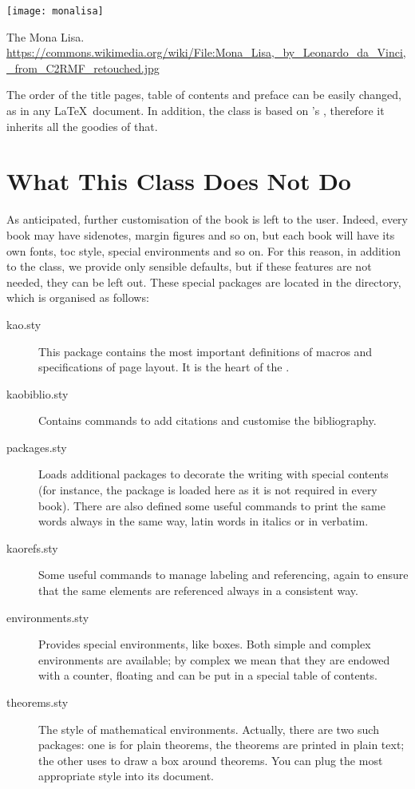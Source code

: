 \begin{marginfigure}[-5.5cm]
    \texttt{[image: monalisa]}
    \caption[The Mona Lisa]{The Mona Lisa.\\ 
    \url{https://commons.wikimedia.org/wiki/File:Mona_Lisa,_by_Leonardo_da_Vinci,_from_C2RMF_retouched.jpg}}
\end{marginfigure}

The order of the title pages, table of contents and preface can be 
easily changed, as in any \LaTeX\ document. In addition, the class is 
based on \KOMAScript's , therefore it inherits all the 
goodies of that.

\section{What This Class Does Not Do}

As anticipated, further customisation of the book is left to the user. 
Indeed, every book may have sidenotes, margin figures and so on, but 
each book will have its own fonts, toc style, special environments and 
so on. For this reason, in addition to the class, we provide only 
sensible defaults, but if these features are not needed, they can be 
left out. These special packages are located in the  
directory, which is organised as follows:

\begin{description}
    \item[kao.sty] This package contains the most important definitions 
    of macros and specifications of page layout. It is the heart of the 
    .
    \item[kaobiblio.sty] Contains commands to add citations and 
    customise the bibliography.
    \item[packages.sty] Loads additional packages to decorate the 
    writing with special contents (for instance, the  
    package is loaded here as it is not required in every book). There 
    are also defined some useful commands to print the same words always 
    in the same way, \eg latin words in italics or  in 
    verbatim.
    \item[kaorefs.sty] Some useful commands to manage labeling and 
    referencing, again to ensure that the same elements are referenced 
    always in a consistent way.
    \item[environments.sty] Provides special environments, like boxes. 
    Both simple and complex environments are available; by complex we 
    mean that they are endowed with a counter, floating and can be put 
    in a special table of contents.
    \item[theorems.sty] The style of mathematical environments. 
    Actually, there are two such packages: one is for plain theorems,
    \ie the theorems are printed in plain text; the other uses 
     to draw a box around theorems. You can plug the 
    most appropriate style into its document.
\end{description}

